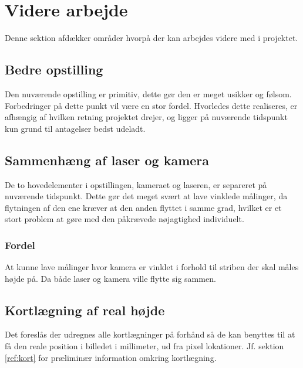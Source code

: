 \section{Videre arbejde}

Denne sektion afdækker områder hvorpå der kan arbejdes videre med i projektet.

\subsection{Bedre opstilling}

Den nuværende opstilling er primitiv, dette gør den er meget usikker og følsom. Forbedringer på dette punkt vil være en stor fordel. Hvorledes dette realiseres, er afhængig af hvilken retning projektet drejer, og ligger på nuværende tidspunkt kun grund til antagelser bedst udeladt.

\subsection{Sammenhæng af laser og kamera}

De to hovedelementer i opstillingen, kameraet og laseren, er separeret på nuværende tidspunkt. Dette gør det meget svært at lave vinklede målinger, da flytningen af den ene kræver at den anden flyttet i samme grad, hvilket er et stort problem at gøre med den påkrævede nøjagtighed individuelt.

\subsubsection{Fordel}
At kunne lave målinger hvor kamera er vinklet i forhold til striben der skal måles højde på. Da både laser og kamera ville flytte sig sammen.


\subsection{Kortlægning af real højde}

Det foreslås der udregnes alle kortlægninger på forhånd så de kan benyttes til at få den reale position i billedet i millimeter, ud fra pixel lokationer. Jf. sektion \ref{ref:kort} for præliminær information omkring kortlægning.